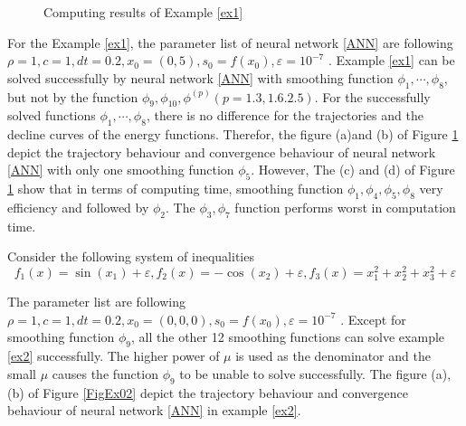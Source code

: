 \documentclass[12pt]{article}
\begin{document}
\begin{figure}[ht]
\centering
{}
\caption{Computing results of Example \ref{ex1}}\label{FigEx01}
\end{figure}



 For the Example \ref{ex1}, the parameter list of neural network \ref{ANN}
 are following $\rho = 1, c=1, dt=0.2, x_0 = (0,5), s_0 = f(x_0),
 \varepsilon = 10^{-7} $ . Example \ref{ex1} can be solved successfully by
  neural network \eqref{ANN} with smoothing function $\phi_1, \cdots , \phi_8$,
  but not by the function  $\phi_9,  \phi_{10}, \phi^{(p)}(p=1.3, 1.6.2.5)$.
 For the successfully solved functions $\phi_1, \cdots , \phi_8$, there is
 no difference for the trajectories and the decline curves of the energy functions.
 Therefor, the figure (a)and (b) of Figure \ref{FigEx01} depict the trajectory behaviour and
 convergence behaviour of neural network \eqref{ANN} with only one smoothing
 function $\phi_5$. However, The (c) and (d) of Figure  \ref{FigEx01} show that in
 terms of computing time, smoothing function $\phi_1, \phi_4, \phi_5, \phi_8$
 very efficiency and followed by $\phi_2$. The $\phi_3, \phi_7$ function
 performs worst in computation time.



 \begin{example}\label{ex2}
 Consider the following system of inequalities
 \[
 f_1(x) =\sin(x_1)+ \varepsilon, f_2(x) = -\cos(x_2)+ \varepsilon,
 f_3(x) = x_1^2 + x_2^2 + x_3^2 + \varepsilon
 \]
 \end{example}


 The parameter list are following $\rho = 1, c=1, dt=0.2, x_0 = (0,0,0),
  s_0 = f(x_0), \varepsilon = 10^{-7} $ .
 Except for smoothing function $\phi_9$, all the other 12 smoothing functions
 can solve example \ref{ex2} successfully. The higher power of $\mu$ is used
 as the denominator and the small $\mu$ causes the function $\phi_9$ to be
 unable to solve successfully. The figure (a), (b) of Figure \ref{FigEx02} depict the
 trajectory behaviour and convergence behaviour of neural network \eqref{ANN}
 in example \ref{ex2}.
\end{document}

